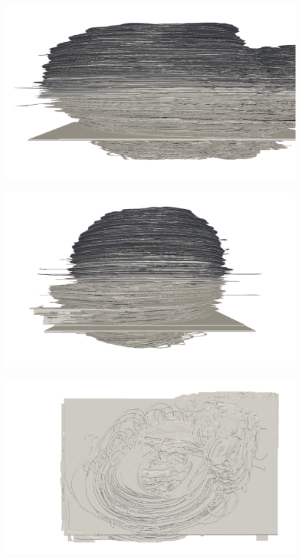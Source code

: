 	\begin{figure}
	  \centering
	  \includegraphics[width=0.9\textheight]{Ch7/Figs/Rat28/contours/whole_negative_x_geometric}
	  \caption{}
	  \label{fig:image1.png}
	\end{figure}

	\begin{figure}
	  \centering
	  \includegraphics[width=0.9\textheight]{Ch7/Figs/Rat28/contours/whole_positive_y_geometric}
	  \caption{}
	  \label{fig:image1.png}
	\end{figure}

	\begin{figure}
	  \centering
	  \includegraphics[width=0.9\textheight]{Ch7/Figs/Rat28/contours/whole_positive_z_geometric}
	  \caption{}
	  \label{fig:image1.png}
	\end{figure}

